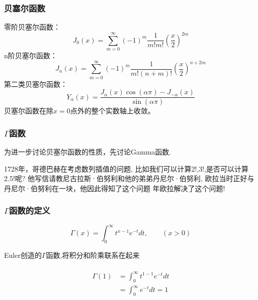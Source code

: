 \begin{frame}
	\frametitle{贝塞尔函数}
	零阶贝塞尔函数：
	\begin{equation*}
		J_0(x) = \sum\limits_{m=0}^{\infty} (-1)^m  \frac{1}{m! m! } (\frac{x}{2})^{2m} 
	\end{equation*}	
	n阶贝塞尔函数：
	\begin{equation*}
		J_n(x) = \sum\limits_{m=0}^{\infty} (-1)^m  \frac{1}{m! (n+m) ! } (\frac{x}{2})^{n+2m} 
	\end{equation*}	
	第二类贝塞尔函数：
	\begin{equation*}
		Y_{\alpha}(x)=\frac{J_{\alpha}(x) \cos (\alpha \pi)-J_{-\alpha}(x)}{\sin (\alpha \pi)}
	\end{equation*}	
	贝塞尔函数在除$x=0$点外的整个实数轴上收敛。
\end{frame}	

\begin{frame}
	\frametitle{$\Gamma$函数}
	为进一步讨论贝塞尔函数的性质，先讨论Gamma函数.\\  
	\begin{enumerate}
		\Item 1728年，哥德巴赫在考虑数列插值的问题, 比如我们可以计算2!,3!,是否可以计算2.5!呢? 
		\Item 他写信请教尼古拉斯·伯努利和他的弟弟丹尼尔·伯努利, 欧拉当时正好与丹尼尔·伯努利在一块，他因此得知了这个问题
		 年欧拉解决了这个问题! 
	\end{enumerate}
	\begin{figure}
		\centering
	\end{figure} 
	\setcounter{subfigure}{0}
\end{frame}	

\begin{frame}
	\frametitle{$\Gamma$函数的定义}	
	\begin{equation*}
		\Gamma(x)=\int_{0}^{\infty} t^{x-1} e^{-t} dt, \qquad (x>0)
	\end{equation*}	
	
	Euler创造的$\Gamma$函数,将积分和阶乘联系在起来\\ \vspace{0.6em}
	\例 [1.试证明]
	{ \[
		\Gamma(1)=1
	   \]}
	\证 ~	
\[ \begin{aligned}
	\Gamma(1)&=\int_{0}^{\infty} t^{1-1} e^{-t} dt \\	
			&=\int_{0}^{\infty}  e^{-t} dt =1	
\end{aligned}\]
\end{frame}	


